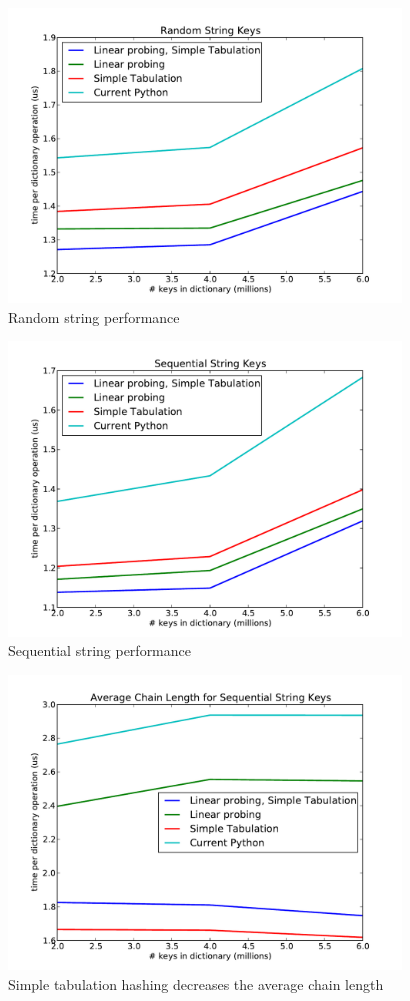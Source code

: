 \documentclass[11pt]{article}
\begin{document}
 \begin{figure}[H]
   \centering
   \includegraphics[width=4.1in]{randstring.pdf}
   \caption{Random string performance}
   \label{fig:randstring}
 \end{figure}
 \begin{figure}[H]
   \centering
   \includegraphics[width=4.1in]{seqstring.pdf}
   \caption{Sequential string performance}
   \label{fig:seqstring}
 \end{figure}
 \begin{figure}[H]
   \centering
   \includegraphics[width=4.1in]{chainlength.pdf}
   \caption{Simple tabulation hashing decreases the average chain length}
   \label{fig:seqstring}
 \end{figure}
\end{document}
